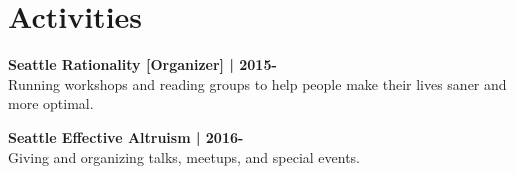 \sectionsep
\section{Activities}

\textbf{Seattle Rationality [Organizer] | 2015-}\\
Running workshops and reading groups to help people make their lives saner and more optimal.
\sectionsep

\textbf{Seattle Effective Altruism | 2016-}\\
Giving and organizing talks, meetups, and special events.
\sectionsep
